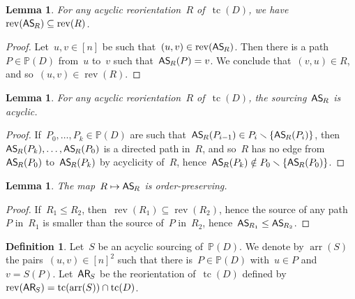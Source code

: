 \documentclass{amsart}
\newtheorem{lemma}[theorem]{Lemma}
\theoremstyle{definition}
\newtheorem{definition}[theorem]{Definition}
\newcommand{\ssm}{\smallsetminus} %
\DeclareMathOperator{\tc}{tc} %
\newcommand{\mymap}[2]{\mathsf{#1}_{\hspace{-.7pt}#2}}
\newcommand{\areori}[1]{\mymap{AR}{#1}}  %
\DeclareMathOperator{\rev}{rev} %
\newcommand{\asour}[1]{\mymap{AS}{#1}}  %
\DeclareMathOperator{\arr}{arr} %
\newcommand{\PP}{\mathbb P} %
\begin{document}
\begin{lemma}
\label{lem:AReori2ASour1}
For any acyclic reorientation~$R$ of~$\tc(D)$, we have~$\rev(\asour{R}) \subseteq \rev(R)$.
\end{lemma}

\begin{proof}
Let~$u,v \in [n]$ be such that~$(u,v) \in \rev(\asour{R})$. 
Then there is a path~$P \in \PP(D)$ from~$u$ to~$v$ such that~$\asour{R}(P) = v$.
We conclude that~$(v,u) \in R$, and so~$(u,v) \in \rev(R)$.
\end{proof}

\begin{lemma}
\label{lem:AReori2ASour2}
For any acyclic reorientation~$R$ of~$\tc(D)$, the sourcing~$\asour{R}$ is acyclic.
\end{lemma}

\begin{proof}
If~$P_0, \dots, P_k \in \PP(D)$ are such that~$\asour{R}(P_{i-1}) \in P_i \ssm \{\asour{R}(P_i)\}$, then~$\asour{R}(P_k), \dots, \asour{R}(P_0)$ is a directed path in~$R$, and so~$R$ has no edge from~$\asour{R}(P_0)$ to~$\asour{R}(P_k)$ by acyclicity of~$R$, hence~${\asour{R}(P_k) \notin P_0 \ssm \{\asour{R}(P_0)\}}$.
\end{proof}

\begin{lemma}
\label{lem:AReori2ASour3}
The map~$R \mapsto \asour{R}$ is order-preserving.
\end{lemma}

\begin{proof}
If~$R_1 \le R_2$, then~$\rev(R_1) \subseteq \rev(R_2)$, hence the source of any path~$P$ in~$R_1$ is smaller than the source of~$P$ in~$R_2$, hence~$\asour{R_1} \le \asour{R_2}$.
\end{proof}

\begin{definition}
\label{def:ASour2AReori}
Let~$S$ be an acyclic sourcing of~$\PP(D)$.
We denote by $\arr(S)$ the pairs~$(u,v) \in [n]^2$ such that there is~$P \in \PP(D)$ with~$u \in P$ and~$v = S(P)$.
Let~$\areori{S}$ be the reorientation of~$\tc(D)$ defined by~$\rev(\areori{S}) = \tc(\arr(S)) \cap \tc(D)$.
\end{definition}
\end{document}
